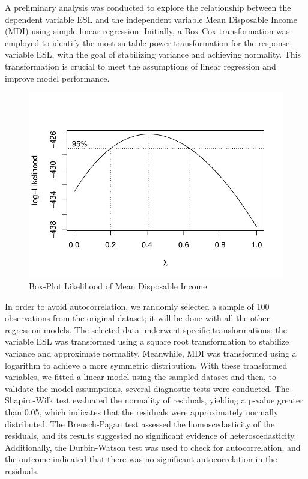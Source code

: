 \documentclass[
  letterpaper,
  DIV=11,
  numbers=noendperiod,
  abstract]{scrartcl}
\begin{document}
A preliminary analysis was conducted to explore the relationship between
the dependent variable ESL and the independent variable Mean Disposable
Income (MDI) using simple linear regression. Initially, a Box-Cox
transformation was employed to identify the most suitable power
transformation for the response variable ESL, with the goal of
stabilizing variance and achieving normality. This transformation is
crucial to meet the assumptions of linear regression and improve model
performance.

\begin{figure}[H]

{\centering \includegraphics[width=1\textwidth,height=\textheight]{report_files/figure-pdf/box_cox_disp_inc-1.pdf}

}

\caption{Box-Plot Likelihood of Mean Disposable Income}

\end{figure}%

In order to avoid autocorrelation, we randomly selected a sample of 100
observations from the original dataset; it will be done with all the
other regression models. The selected data underwent specific
transformations: the variable ESL was transformed using a square root
transformation to stabilize variance and approximate normality.
Meanwhile, MDI was transformed using a logarithm to achieve a more
symmetric distribution. With these transformed variables, we fitted a
linear model using the sampled dataset and then, to validate the model
assumptions, several diagnostic tests were conducted. The Shapiro-Wilk
test evaluated the normality of residuals, yielding a p-value greater
than 0.05, which indicates that the residuals were approximately
normally distributed. The Breusch-Pagan test assessed the
homoscedasticity of the residuals, and its results suggested no
significant evidence of heteroscedasticity. Additionally, the
Durbin-Watson test was used to check for autocorrelation, and the
outcome indicated that there was no significant autocorrelation in the
residuals.
\end{document}
